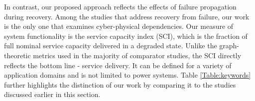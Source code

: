 \documentclass[runningheads]{llncs}
\begin{document}
In contrast, our proposed approach reflects the effects of failure propagation during recovery. Among the studies that address recovery from failure, our work is the only one that examines cyber-physical dependencies. Our measure of system functionality is the service capacity index (SCI), which is the fraction of full nominal service capacity delivered in a degraded state. Unlike the graph-theoretic metrics used in the majority of comparator studies, the SCI directly reflects the bottom line - service delivery. It can be defined for a variety of application domains and is not limited to power systems.  Table \ref{Table:keywords} further highlights the distinction of our work by comparing it to the studies discussed earlier in this section. 


  
\end{document}
